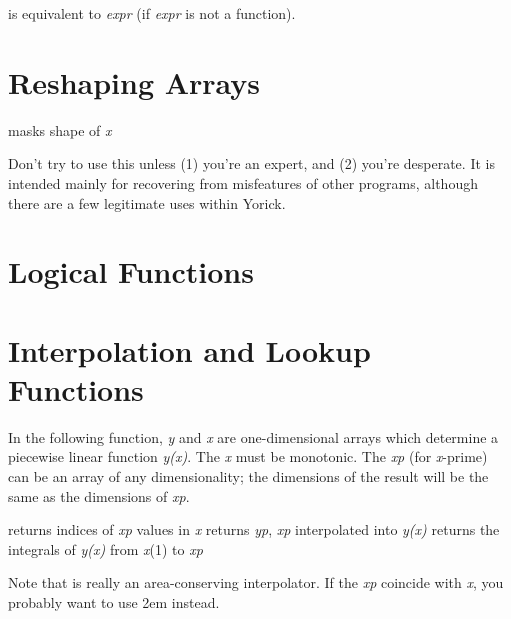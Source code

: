is equivalent to  {\it expr\/} (if {\it expr\/} is not a function).

\section{Reshaping Arrays}

     {masks shape of {\it x}}

Don't try to use this unless (1) you're an expert, and (2) you're desperate.
It is intended mainly for recovering from misfeatures of other programs,
although there are a few legitimate uses within Yorick.

\section{Logical Functions}



\section{Interpolation and Lookup Functions}

In the following function, {\it y\/} and {\it x\/} are one-dimensional
arrays which determine a piecewise linear function {\it y(x)}.  The {\it x\/}
must be monotonic.  The {\it xp\/} (for {\it x\/}-prime) can be an
array of any dimensionality; the dimensions of the result will be the
same as the dimensions of {\it xp}.

     {returns indices of {\it xp\/} values in {\it x}}
     {returns {\it yp}, {\it xp\/} interpolated into {\it y(x)}}
     {returns the integrals of {\it y(x)\/} from {\it x\/}(1) to {\it xp}}

Note that  is really an area-conserving interpolator.  If
the {\it xp} coincide with {\it x}, you probably want to use \hfil\break
\hglue2em  \hfil\break
instead.

